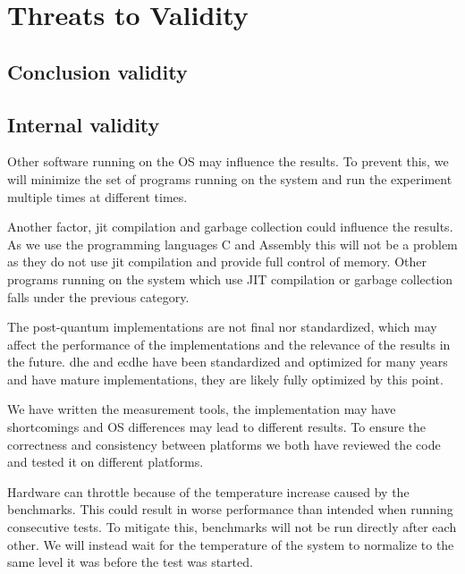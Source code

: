 \section{Threats to Validity}

\subsection{Conclusion validity}


\subsection{Internal validity}
\label{section:method:internal-validity}
Other software running on the OS may influence the results. To prevent this, we will minimize the set of programs running on the system and run the experiment multiple times at different times.

Another factor, \gls{jit} compilation and garbage collection could influence the results. As we use the programming languages C and Assembly this will not be a problem as they do not use \gls{jit} compilation and provide full control of memory. Other programs running on the system which use JIT compilation or garbage collection falls under the previous category.




The post-quantum implementations are not final nor standardized, which may affect the performance of the implementations and the relevance of the results in the future. \gls{dhe} and \gls{ecdhe} have been standardized and optimized for many years and have mature implementations, they are likely fully optimized by this point.

We have written the measurement tools, the implementation may have shortcomings and OS differences may lead to different results. To ensure the correctness and consistency between platforms we both have reviewed the code and tested it on different platforms.

Hardware can throttle because of the temperature increase caused by the benchmarks. This could result in worse performance than intended when running consecutive tests. To mitigate this, benchmarks will not be run directly after each other. We will instead wait for the temperature of the system to normalize to the same level it was before the test was started.

